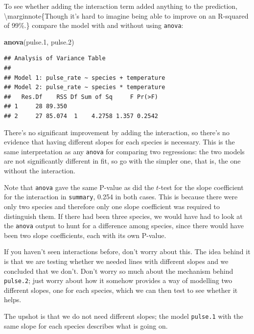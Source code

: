 \documentclass[]{tufte-book}
\newenvironment{Shaded}{}{}
\newcommand{\FloatTok}[1]{\textcolor[rgb]{0.25,0.63,0.44}{#1}}
\newcommand{\KeywordTok}[1]{\textcolor[rgb]{0.00,0.44,0.13}{\textbf{#1}}}
\newcommand{\NormalTok}[1]{#1}
\theoremstyle{definition}
\theoremstyle{definition}
\theoremstyle{definition}
\theoremstyle{remark}
\begin{document}
To see whether adding the interaction term added anything to the
prediction, \textbackslash{}marginnote\{Though it's hard to imagine
being able to improve on an R-squared of 99\%.\} compare the model with
and without using \texttt{anova}:

\begin{Shaded}
\begin{Highlighting}[]
\KeywordTok{anova}\NormalTok{(pulse}\FloatTok{.1}\NormalTok{, pulse}\FloatTok{.2}\NormalTok{)}
\end{Highlighting}
\end{Shaded}

\begin{verbatim}
## Analysis of Variance Table
## 
## Model 1: pulse_rate ~ species + temperature
## Model 2: pulse_rate ~ species * temperature
##   Res.Df    RSS Df Sum of Sq     F Pr(>F)
## 1     28 89.350                          
## 2     27 85.074  1    4.2758 1.357 0.2542
\end{verbatim}

There's no significant improvement by adding the interaction, so there's
no evidence that having different slopes for each species is necessary.
This is the same interpretation as any \texttt{anova} for comparing two
regressions: the two models are not significantly different in fit, so
go with the simpler one, that is, the one without the interaction.

Note that \texttt{anova} gave the same P-value as did the \(t\)-test for
the slope coefficient for the interaction in \texttt{summary}, 0.254 in
both cases. This is because there were only two species and therefore
only one slope coefficient was required to distinguish them. If there
had been three species, we would have had to look at the \texttt{anova}
output to hunt for a difference among species, since there would have
been two slope coefficients, each with its own P-value.

If you haven't seen interactions before, don't worry about this. The
idea behind it is that we are testing whether we needed lines with
different slopes and we concluded that we don't. Don't worry so much
about the mechanism behind \texttt{pulse.2}; just worry about how it
somehow provides a way of modelling two different slopes, one for each
species, which we can then test to see whether it helps.

The upshot is that we do not need different slopes; the model
\texttt{pulse.1} with the same slope for each species describes what is
going on.
\end{document}
